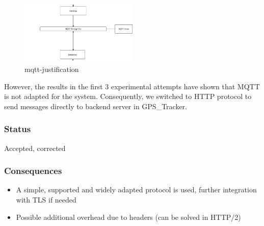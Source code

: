 \begin{figure}
\centering
\includegraphics[width=0.5\textwidth,height=\textheight]{mqtt-justification.png}
\caption{mqtt-justification}
\end{figure}

However, the results in the first 3 experimental attempts have shown
that MQTT is not adapted for the system. Consequently, we switched to
HTTP protocol to send messages directly to backend server in
GPS\_Tracker.

\hypertarget{status-1}{%
\subsubsection{Status}\label{status-1}}

Accepted, corrected

\hypertarget{consequences-1}{%
\subsubsection{Consequences}\label{consequences-1}}

\begin{itemize}
\tightlist
\item
  A simple, supported and widely adapted protocol is used, further
  integration with TLS if needed
\item
  Possible additional overhead due to headers (can be solved in HTTP/2)
\end{itemize}
